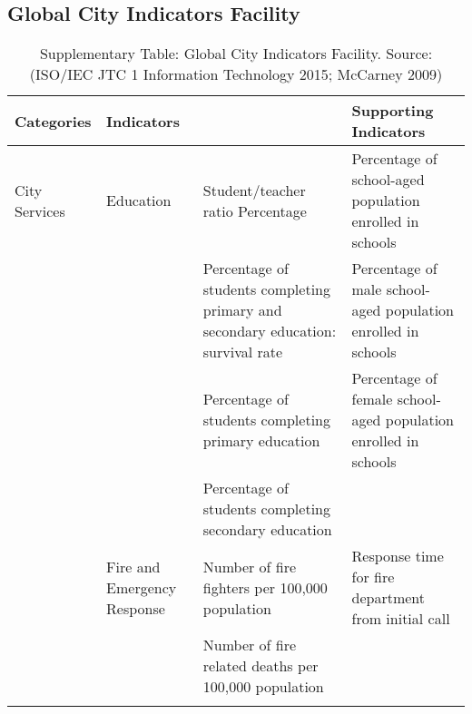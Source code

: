 \begin{landscape}

\chapter{Global City Indicators Facility} %

\label{AppendixB} %

\begin{table}[th]
\caption{Supplementary Table: Global City Indicators Facility. Source: (ISO/IEC JTC 1 Information Technology 2015; McCarney 2009)}
\begin{center}
\begin{tabular}{ >{\raggedright\arraybackslash}p{} >{\raggedright\arraybackslash}p{} >{\raggedright\arraybackslash}p{} >{\raggedright\arraybackslash}p{} } 
\hline
Categories & Indicators &  & Supporting Indicators \\
\hline
City Services & Education & Student/teacher ratio Percentage & Percentage of school-aged population enrolled in schools \\
  &  & Percentage of students completing primary and secondary education: survival rate & Percentage of male school-aged population enrolled in schools \\
  &  & Percentage of students completing primary education & Percentage of female school-aged population enrolled in schools \\
  &  & Percentage of students completing secondary education \linebreak &  \\
  & Fire and Emergency Response & Number of fire fighters per 100,000 population & Response time for fire department from initial call \\
  &  & Number of fire related deaths per 100,000 population &  \\
\hline
\label{tbl:globalCityIndicatorsFacility0}
\end{tabular}
\end{center}
\end{table}


\end{landscape}
